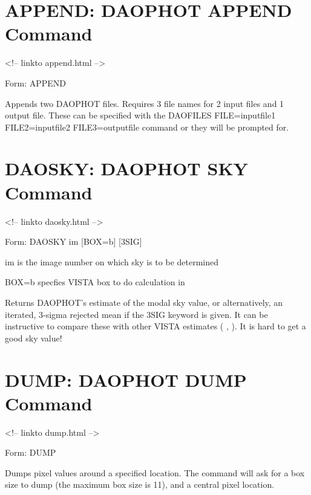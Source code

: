\section{APPEND: DAOPHOT APPEND Command}
\begin{rawhtml}
<!-- linkto append.html -->
\end{rawhtml}
\begin{command}
  \item[Form: APPEND\hfill]{}
\end{command}

Appends two DAOPHOT files. Requires 3 file names for 2 input files and 1
output file. These can be specified with the DAOFILES FILE=inputfile1
FILE2=inputfile2 FILE3=outputfile command or they will be prompted for.

\section{DAOSKY: DAOPHOT SKY Command}
\begin{rawhtml}
<!-- linkto daosky.html -->
\end{rawhtml}
\begin{command}
  \item[Form: DAOSKY im {[BOX=b]} {[3SIG]}\hfill]{}
  \item[im]{is the image number on which sky is to be determined}
  \item[BOX=b]{specfies VISTA box to do calculation in}
\end{command}

Returns DAOPHOT's estimate of the modal sky value, or alternatively, an
iterated, 3-sigma rejected mean if the 3SIG keyword is given.  It can be
instructive to compare these
with other VISTA estimates (
, 
).  It is hard to get a good sky value!

\section{DUMP: DAOPHOT DUMP Command}
\begin{rawhtml}
<!-- linkto dump.html -->
\end{rawhtml}
\begin{command}
  \item[Form: DUMP\hfill]{}
\end{command}

Dumps pixel values around a specified location. The command will ask for a
box size to dump (the maximum box size is 11), and a central pixel
location.

